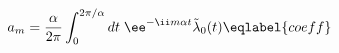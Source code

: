 \begin{equation}
a_m = \frac{\alpha}{2\pi} \int_0^{2\pi/\alpha}dt\; \ee^{-\ii m\alpha t}
\tilde\lambda_0(t)
\eqlabel{coeff}
\end{equation}

